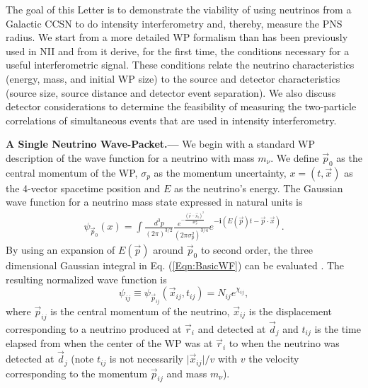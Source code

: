 \documentclass[aps,prl,reprint,floatfix
]{revtex4-1}
\newcommand{\heading}[1]{\textbf{#1.---}}
\begin{document}
The goal of this Letter is to demonstrate the viability of using neutrinos from a Galactic CCSN to do intensity interferometry and, thereby, measure the PNS radius. We start from a more detailed WP formalism than has been previously used in NII and from it derive, for the first time, the conditions necessary for a useful interferometric signal. These conditions relate the neutrino characteristics (energy, mass, and initial WP size) to the source and detector characteristics (source size, source distance and detector event separation). We also discuss detector considerations to determine the feasibility of measuring the two-particle correlations of simultaneous events that are used in intensity interferometry. 

\heading{A Single Neutrino Wave-Packet}
We begin with a standard WP description of the wave function \cite{2004FoPhL..17..103G,2002JHEP...11..017G} for a neutrino with mass $m_{\nu}$. We define $\vec{p}_0$ as the central momentum of the WP, $\sigma_p$ as the momentum uncertainty, $x=(t,\vec{x})$ as the 4-vector spacetime position and $E$ as the neutrino's energy. The Gaussian wave function for a neutrino mass state expressed in natural units is
\begin{align}
	\psi_{\vec{p}_0}\left(x\right)=\int\frac{d^3p}{\left(2\pi\right)^{3/2}}
    \frac{    
    e^{
    	-\frac{\left(\vec{p}-\vec{p}_0\right)^2}{4\sigma_p^2}
    }    
    }{\left(2\pi\sigma_p^2\right)^{3/4}}
    e^{
    	-\bm{i}\left(E\left(\vec{p}\right)t-\vec{p}\cdot\vec{x}\right)
    }.\label{Eqn:BasicWF}
\end{align}
By using an expansion of $E\left(\vec{p}\right)$ around $\vec{p}_0$ to second order, the three dimensional Gaussian integral in Eq. (\ref{Eqn:BasicWF}) can be evaluated \cite{SupplementalMaterial}. The resulting normalized wave function is
\begin{equation}
	\psi_{ij}\equiv\psi_{\vec{p}_{ij}}\left(\vec{x}_{ij},t_{ij}\right)=
		N_{ij} e^{\chi_{ij}},
    \label{Eqn:WF}
\end{equation}
where $\vec{p}_{ij}$ is the central momentum of the neutrino, $\vec{x}_{ij}$ is the displacement corresponding to a neutrino produced at $\vec{r}_i$ and detected at $\vec{d}_j$ and $t_{ij}$ is the time elapsed from when the center of the WP was at $\vec{r}_i$ to when the neutrino was detected at $\vec{d}_j$ (note $t_{ij}$ is not necessarily $\vert\vec{x}_{ij}\vert/v$ with $v$ the velocity corresponding to the momentum $\vec{p}_{ij}$ and mass $m_{\nu}$). 
\end{document}
